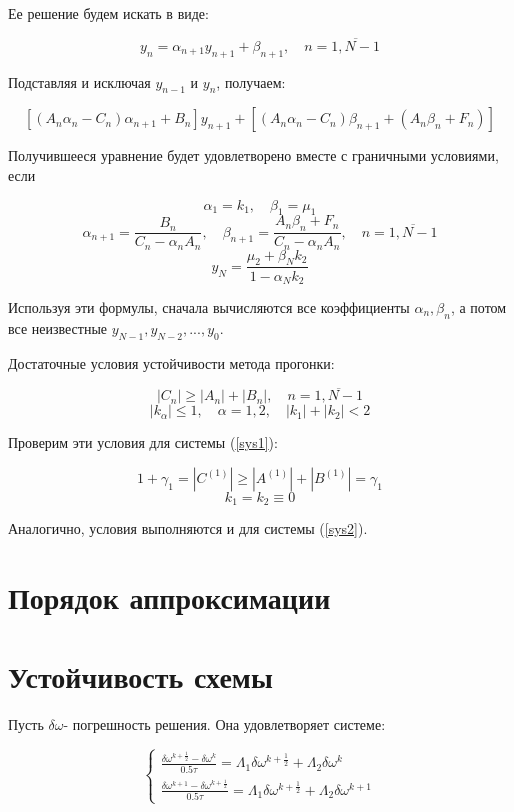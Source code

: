 \documentclass[12pt]{article}
\begin{document}
			Ее решение будем искать в виде:
			
			$$y_n  = \alpha_{n+1} y_{n+1} + \beta_{n+1}, \quad n = \overline{1, N-1}$$
			
			Подставляя и исключая $y_{n-1}$ и $y_n$, получаем:
			
			$$[(A_n \alpha_n - C_n)\alpha_{n+1} + B_n]y_{n+1} + [(A_n \alpha_n - C_n)\beta_{n+1} + (A_n \beta_n + F_n)]$$
			
			Получившееся уравнение будет удовлетворено вместе с граничными условиями, если
			
			$$\alpha_1 = k_1, \quad \beta_1 = \mu_1$$
			$$\alpha_{n+1} = \frac{B_n}{C_n - \alpha_n A_n}, \quad \beta_{n+1} = \frac{A_n \beta_n + F_n}{C_n - \alpha_n A_n}, \quad n = \overline{1, N-1}$$
			$$y_N = \frac{\mu_2 + \beta_N k_2}{1 - \alpha_N k_2}$$
			
			Используя эти формулы, сначала вычисляются все коэффициенты $\alpha_n, \beta_n$, а потом все неизвестные $y_{N-1}, y_{N-2}, ..., y_0$.
			
			Достаточные условия устойчивости метода прогонки:
			
			$$|C_n| \ge |A_n| + |B_n|, \quad n = \overline{1, N-1}$$
			$$|k_\alpha| \le 1, \quad \alpha = 1, 2, \quad |k_1| + |k_2| < 2$$
			
			Проверим эти условия для системы (\ref{sys1}):
			
			$$1 + \gamma_1 = |C^{(1)}| \ge |A^{(1)}| + |B^{(1)}| = \gamma_1$$
			$$k_1 = k_2 \equiv 0$$
			
			Аналогично, условия выполняются и для системы (\ref{sys2}).
			
	\section{Порядок аппроксимации}
	
	\section{Устойчивость схемы}
		Пусть $\delta \omega$- погрешность решения. Она удовлетворяет системе:
		
		\begin{equation}
			\begin{cases}
				\frac{\delta \omega^{k+\frac{1}{2}} - \delta \omega^k}{0.5\tau} = \Lambda_1 \delta\omega^{k + \frac{1}{2}} + \Lambda_2 \delta\omega^k\\
										
				\frac{ \delta\omega^{k+1} - \delta\omega^{k+\frac{1}{2}}}{0.5\tau} = \Lambda_1 \delta\omega^{k + \frac{1}{2}} + \Lambda_2 \delta\omega^{k+1}
			\end{cases}
		\end{equation}
		
\end{document}
